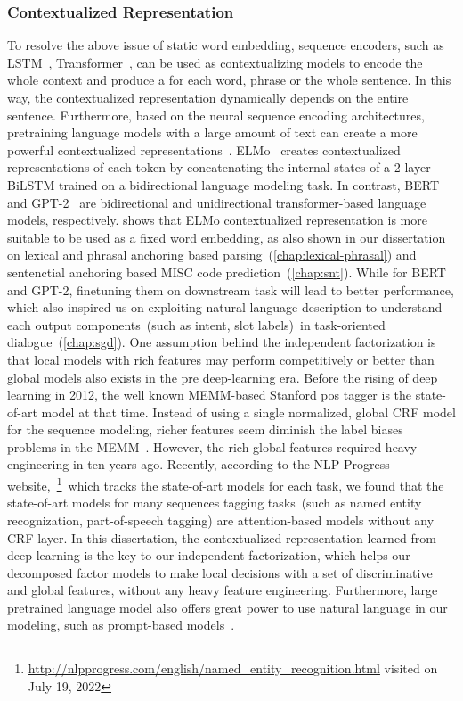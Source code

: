 \subsubsection{Contextualized Representation}
\label{sssec:bg:contextualizing}
To resolve the above issue of static word embedding, sequence
encoders, such as LSTM~\citep{hochreiter97lstm},
Transformer~\citep{NIPS2017_7181}, can be used as contextualizing
models to encode the whole context and produce a  for each word, phrase or the whole sentence. In this
way, the contextualized representation dynamically depends on the
entire sentence. Furthermore, based on the neural sequence encoding
architectures, pretraining language models with a large amount of text
can create a more powerful contextualized
representations~\citep{ethayarajh2019contextual}. ELMo~\cite{Peters:2018}
creates contextualized representations of each token by concatenating
the internal states of a 2-layer BiLSTM trained on a bidirectional
language modeling task. In contrast, BERT~\citep{devlin2019bert} and
GPT-2~\citep{radford2018improving} are bidirectional and
unidirectional transformer-based language models,
respectively. \citet{peters2019tune} shows that ELMo contextualized
representation is more suitable to be used as a fixed word embedding,
as also shown in our dissertation on lexical and phrasal anchoring
based parsing~(\autoref{chap:lexical-phrasal}) and sentenctial
anchoring based MISC code prediction~(\autoref{chap:snt}). While for
BERT and GPT-2, finetuning them on downstream task will lead to better
performance, which also inspired us on exploiting natural language
description to understand each output components~(such as intent, slot
labels)~in task-oriented dialogue~(\autoref{chap:sgd}).  One
assumption behind the independent factorization is that local models
with rich features may perform competitively or better than global
models also exists in the pre deep-learning era. Before the rising of deep
learning in 2012, the well known MEMM-based Stanford pos tagger is the
state-of-art model at that time. Instead of using a single normalized,
global CRF model for the sequence modeling, richer features seem
diminish the label biases problems in the
MEMM~\citep{toutanvoa2000enriching,toutanova2003feature}. However, the
rich global features required heavy engineering in ten years ago.
Recently, according to the NLP-Progress
website,~\footnote{\url{http://nlpprogress.com/english/named_entity_recognition.html}
  visited on July 19, 2022}~which tracks the state-of-art models for
each task, we found that the state-of-art models for many sequences
tagging tasks~(such as named entity recognization, part-of-speech
tagging) are attention-based models without any CRF layer. In this
dissertation, the contextualized representation learned from deep
learning is the key to our independent factorization, which helps our
decomposed factor models to make local decisions with a set of
discriminative and global features, without any heavy feature
engineering. Furthermore, large pretrained language model also offers
great power to use natural language in our modeling, such as
prompt-based models~\citep{shin2020autoprompt,liu2021pre}.

